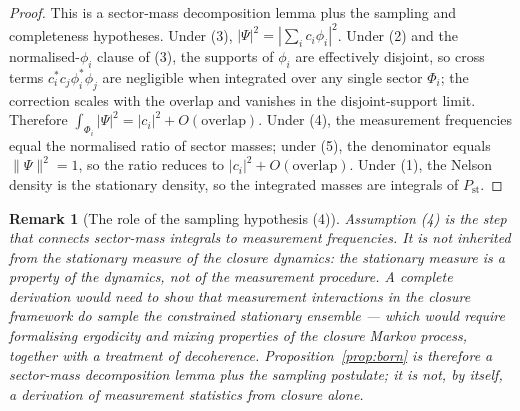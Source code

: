 \documentclass[12pt]{article}
\newtheorem{remark}[theorem]{Remark}
\newcommand{\Pst}{P_{\mathrm{st}}}
\begin{document}
\begin{proof}
This is a sector-mass decomposition lemma plus the sampling and completeness hypotheses. Under (3), $|\Psi|^2 = |\sum_i c_i \phi_i|^2$. Under (2) and the normalised-$\phi_i$ clause of (3), the supports of $\phi_i$ are effectively disjoint, so cross terms $c_i^* c_j \phi_i^* \phi_j$ are negligible when integrated over any single sector $\Phi_i$; the correction scales with the overlap and vanishes in the disjoint-support limit. Therefore $\int_{\Phi_i}|\Psi|^2 = |c_i|^2 + O(\text{overlap})$. Under (4), the measurement frequencies equal the normalised ratio of sector masses; under (5), the denominator equals $\|\Psi\|^2 = 1$, so the ratio reduces to $|c_i|^2 + O(\text{overlap})$. Under (1), the Nelson density is the stationary density, so the integrated masses are integrals of $\Pst$.
\end{proof}

\begin{remark}[The role of the sampling hypothesis (4)]\label{rem:sampling}
Assumption (4) is the step that connects sector-mass integrals to measurement frequencies. It is \emph{not} inherited from the stationary measure of the closure dynamics: the stationary measure is a property of the dynamics, not of the measurement procedure. A complete derivation would need to show that measurement interactions in the closure framework do sample the constrained stationary ensemble --- which would require formalising ergodicity and mixing properties of the closure Markov process, together with a treatment of decoherence. Proposition~\ref{prop:born} is therefore a sector-mass decomposition lemma \emph{plus} the sampling postulate; it is not, by itself, a derivation of measurement statistics from closure alone.
\end{remark}
\end{document}
